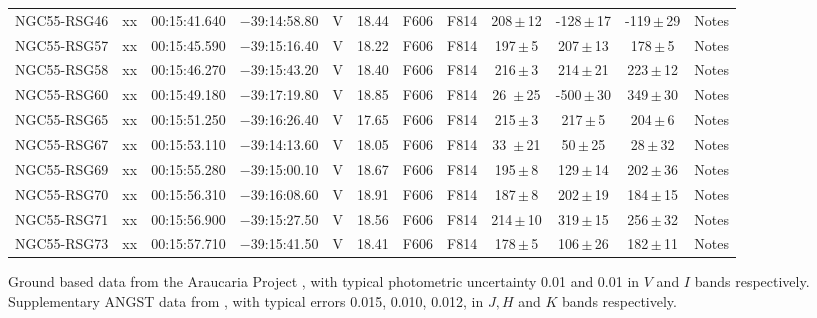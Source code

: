 \begin{table}
\begin{threeparttable}
\begin{tabular}{lrcccccccccl}
NGC55-RSG46 & xx & 00:15:41.640 & $-$39:14:58.80& V & 18.44 & F606 & F814 & 208\,$\pm$\,12 & -128\,$\pm$\,17 & -119\,$\pm$\,29 & Notes\\
NGC55-RSG57 & xx & 00:15:45.590 & $-$39:15:16.40& V & 18.22 & F606 & F814 & 197\,$\pm$\,5  & 207\,$\pm$\,13 & 178\,$\pm$\,5 & Notes\\
NGC55-RSG58 & xx & 00:15:46.270 & $-$39:15:43.20& V & 18.40 & F606 & F814 & 216\,$\pm$\,3  & 214\,$\pm$\,21 & 223\,$\pm$\,12 & Notes\\
NGC55-RSG60 & xx & 00:15:49.180 & $-$39:17:19.80& V & 18.85 & F606 & F814 & 26 \,$\pm$\,25 & -500\,$\pm$\,30 & 349\,$\pm$\,30 & Notes\\
NGC55-RSG65 & xx & 00:15:51.250 & $-$39:16:26.40& V & 17.65 & F606 & F814 & 215\,$\pm$\,3  & 217\,$\pm$\,5 & 204\,$\pm$\,6 & Notes\\
NGC55-RSG67 & xx & 00:15:53.110 & $-$39:14:13.60& V & 18.05 & F606 & F814 & 33 \,$\pm$\,21 & 50\,$\pm$\,25 & 28\,$\pm$\,32 & Notes\\
NGC55-RSG69 & xx & 00:15:55.280 & $-$39:15:00.10& V & 18.67 & F606 & F814 & 195\,$\pm$\,8  & 129\,$\pm$\,14 & 202\,$\pm$\,36 & Notes\\
NGC55-RSG70 & xx & 00:15:56.310 & $-$39:16:08.60& V & 18.91 & F606 & F814 & 187\,$\pm$\,8  & 202\,$\pm$\,19 & 184\,$\pm$\,15 & Notes\\
NGC55-RSG71 & xx & 00:15:56.900 & $-$39:15:27.50& V & 18.56 & F606 & F814 & 214\,$\pm$\,10 & 319\,$\pm$\,15 & 256\,$\pm$\,32 & Notes\\
NGC55-RSG73 & xx & 00:15:57.710 & $-$39:15:41.50& V & 18.41 & F606 & F814 & 178\,$\pm$\,5  & 106\,$\pm$\,26 & 182\,$\pm$\,11 & Notes\\

\hline
\end{tabular}
\begin{tablenotes}
  \item Ground based data from the Araucaria Project
  \protect\cite{2006AJ....132.2556P}, with typical photometric uncertainty 0.01 and 0.01 in $V$ and $I$ bands respectively.
  Supplementary ANGST data from
  \protect\cite{2009ApJS..183...67D}, with typical errors 0.015, 0.010, 0.012, in $J, H$ and $K$ bands respectively.
\end{tablenotes}
\end{threeparttable}
\end{table}



